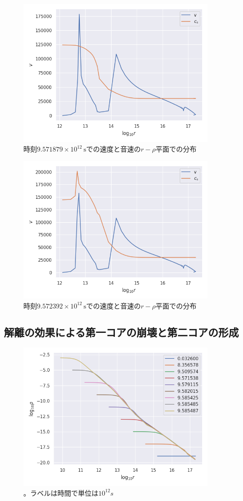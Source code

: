 \documentclass[a4j, dvipdfmx]{jsarticle}
\begin{document}
\begin{figure}[H]
    \includegraphics[clip,width=10.0cm]{graph/v_r_cs_9571879.png}
    \caption{時刻$9.571879\times10^{12}\,\mathrm{s}$での速度と音速の$r-\rho$平面での分布}

    \label{fig:1879}
\end{figure}
\begin{figure}[H]
    \includegraphics[clip,width=10.0cm]{graph/v_r_cs_9572392.png}
    \caption{時刻$9.572392\times10^{12}\,\mathrm{s}$での速度と音速の$r-\rho$平面での分布}
    \label{fig:2392}
\end{figure}

\subsection{解離の効果による第一コアの崩壊と第二コアの形成}
\begin{figure}[H]
    \includegraphics[clip,width=10.0cm]{graph/rho_r.png}
    \caption{。ラベルは時間で単位は$10^{12}s$}
    \label{fig:rho_r}
\end{figure}
\end{document}
